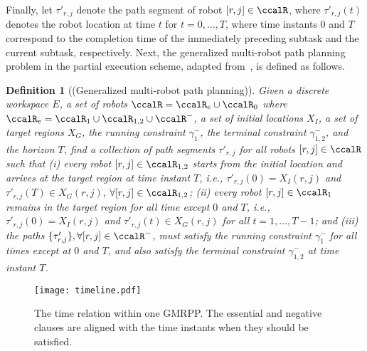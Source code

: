 \documentclass[Afour,sageh,times]{sagej}
\newtheorem{defn}[thm]{Definition}
\begin{document}
{{Finally, let $\tau'_{r,j}$ denote the path segment of robot $[r,j] \in \ccalR$, where $\tau'_{r,j}(t)$ denotes the robot location at time $t$ for $ t = 0,  \ldots, T$, where time instants 0  and $T$ correspond to the completion time of the immediately preceding subtask and the current subtask, respectively. Next, the generalized multi-robot path planning problem in the partial execution scheme, adapted from~\cite{yu2016optimal}, is defined as follows.
 \begin{defn}[(Generalized multi-robot path planning)]\label{defn:gmmpp}
    Given a discrete workspace $E$, a set of robots $\ccalR= \ccalR_e \cup \ccalR_0$ where $\ccalR_e = \ccalR_1 \cup\ccalR_{1,2} \cup \ccalR^-$, a set of initial locations $X_I$, a set of target regions $X_G$, the running constraint $\gamma_1^-$, the terminal constraint $\gamma_{1,2}^-$, and the horizon $T$, find a collection of path segments $\tau'_{r,j}$ for all robots $[r,j]\in \ccalR$ such that {\it (i)} every robot $[r,j] \in \ccalR_{1,2}$ starts from the initial location and arrives at the target region at time instant $T$, i.e., $ \tau'_{r,j}(0) = X_I(r,j)$ and  $ \tau'_{r,j}(T) \in X_G(r,j)$, $\forall [r,j] \in  \ccalR_{1,2}$; {\it (ii)} every robot $[r,j] \in \ccalR_1$ remains in the target region for all time except $0$ and $T$, i.e., $ \tau'_{r,j}(0) = X_I(r,j)$ and $\tau'_{r,j}(t) \in X_G(r,j)$ for all $t=1,\ldots, T-1$;
  and {\it (iii)} the paths $\{\tau'_{r,j}\}, \forall [r,j] \in \ccalR^-$, must satisfy the running constraint $\gamma^-_1$ for all times except at $0$ and $T$, and also satisfy the terminal constraint $\gamma^-_{1,2}$ at time instant $T$.
 \end{defn}

 \begin{figure}[!t]
   \centering
   \texttt{[image: timeline.pdf]}
   \caption{The time relation within one GMRPP. The essential and negative clauses are aligned with the time instants when they should be satisfied.}
   \label{fig:timeline}
 \end{figure}

}}
\end{document}
